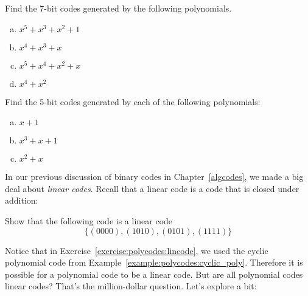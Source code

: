 \begin{exercise}
Find the 7-bit codes generated by the following polynomials.
\begin{enumerate}[(a)]
\item $x^5 + x^3 + x^2 + 1$
\item $x^4 + x^3 + x$
\item $x^5 + x^4 + x^2 + x$
\item $x^4 + x^2$
\end{enumerate}
\end{exercise}
%

\begin{exercise}
Find the 5-bit codes generated by each of the following polynomials: 
\begin{enumerate}[(a)]
\item $x + 1$
\item $x^3+x+1$
\item $x^2 + x$
\end{enumerate}
\end{exercise}


In our previous discussion of binary codes in Chapter~\ref{algcodes}, we made a big deal about \emph{linear codes}.  Recall that a linear code is a code that is closed under addition:  

\begin{exercise}\label{exercise:polycodes:lincode}
Show that the following code is a linear code
\[\{(0000),(1010),(0101),(1111)\}\]
\end{exercise}

Notice that in Exercise~\ref{exercise:polycodes:lincode}, we used the cyclic polynomial code from Example~\ref{example:polycodes:cyclic_poly}.  Therefore it is possible for a polynomial code to be a linear code.  But are all polynomial codes linear codes? That's the million-dollar question. Let's explore a bit:


